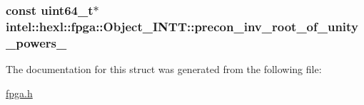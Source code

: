 \hypertarget{structintel_1_1hexl_1_1fpga_1_1Object__INTT_a916b6af204fa6a6236b3d7a332bb9999}{
\subsubsection[{precon\-\_\-inv\-\_\-root\-\_\-of\-\_\-unity\-\_\-powers\-\_\-}]{\setlength{\rightskip}{0pt plus 5cm}const uint64\-\_\-t$\ast$ intel\-::hexl\-::fpga\-::\-Object\-\_\-\-I\-N\-T\-T\-::precon\-\_\-inv\-\_\-root\-\_\-of\-\_\-unity\-\_\-powers\-\_\-}}\label{structintel_1_1hexl_1_1fpga_1_1Object__INTT_a916b6af204fa6a6236b3d7a332bb9999}


The documentation for this struct was generated from the following file\-:\begin{DoxyCompactItemize}
\item 
\hyperlink{fpga_8h}{fpga.\-h}\end{DoxyCompactItemize}
